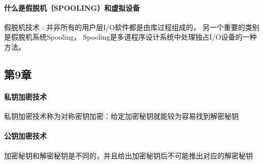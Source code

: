 \documentclass[UTF8,a4paper]{ctexart}
\begin{document}
\paragraph{什么是假脱机（SPOOLING）和虚拟设备}
假脱机技术 : 并非所有的用户层I/O软件都是由库过程组成的，
另一个重要的类别是假脱机系统Spooling， Spooling是多道程序设计系统中处理独占I/O设备的一种方法。

\subsection{第9章}
\paragraph{私钥加密技术}私钥加密技术称为对称密钥加密：给定加密秘钥就能较为容易找到解密秘钥

\paragraph{公钥加密技术} 加密秘钥和解密秘钥是不同的，并且给出加密秘钥后不可能推出对应的解密秘钥
\end{document}
